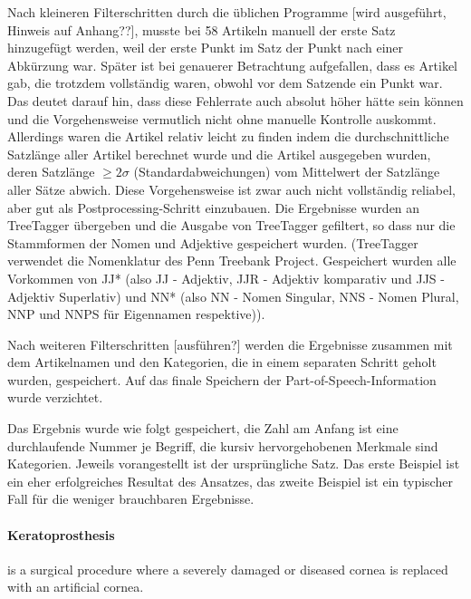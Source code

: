 \documentclass[pagesize,DIV=calc,12pt,draft]{scrreprt}
\begin{document}
\begin{inparaenum}
\item   Nach kleineren Filterschritten durch die üblichen Programme {[}wird   ausgeführt, Hinweis auf Anhang??{]}, musste bei 58 Artikeln manuell   der erste Satz hinzugefügt werden, weil der erste Punkt im Satz der   Punkt nach einer Abkürzung war. 
Später ist bei genauerer Betrachtung   aufgefallen, dass es Artikel gab, die trotzdem vollständig waren,   obwohl vor dem Satzende ein Punkt war. 
Das deutet darauf hin, dass   diese Fehlerrate auch absolut höher hätte sein können und die   Vorgehensweise vermutlich nicht ohne manuelle Kontrolle auskommt. 
Allerdings waren die Artikel relativ leicht zu finden indem die   durchschnittliche Satzlänge aller Artikel berechnet wurde und die   Artikel ausgegeben wurden, deren Satzlänge $\geq 2 \sigma $   (Standardabweichungen) vom Mittelwert der Satzlänge aller Sätze abwich. 
Diese Vorgehensweise ist   zwar auch nicht vollständig reliabel, aber gut als   Postprocessing-Schritt einzubauen. 
Die Ergebnisse wurden an TreeTagger   übergeben und die Ausgabe von TreeTagger gefiltert, so dass nur die   Stammformen der Nomen und Adjektive gespeichert wurden. (TreeTagger   verwendet die Nomenklatur des Penn Treebank Project. 
Gespeichert   wurden alle Vorkommen von JJ* (also JJ - Adjektiv, JJR - Adjektiv   komparativ und JJS - Adjektiv Superlativ) und NN* (also NN - Nomen   Singular, NNS - Nomen Plural, NNP und NNPS für Eigennamen   respektive)). 

\item   Nach weiteren Filterschritten {[}ausführen?{]} werden die Ergebnisse   zusammen mit dem Artikelnamen und den Kategorien, die in einem   separaten Schritt geholt wurden, gespeichert. 
Auf das finale Speichern   der Part-of-Speech-Information wurde verzichtet. 
\end{inparaenum}

Das Ergebnis wurde wie folgt gespeichert, die Zahl am Anfang ist eine durchlaufende Nummer je Begriff, die kursiv hervorgehobenen Merkmale sind Kategorien. 
Jeweils vorangestellt ist der ursprüngliche Satz. 
Das erste Beispiel ist ein eher erfolgreiches Resultat des Ansatzes, das zweite Beispiel ist ein typischer Fall für die weniger brauchbaren Ergebnisse. 

\paragraph{Keratoprosthesis} is a surgical procedure where a severely damaged or diseased cornea is replaced with an artificial cornea.
\end{document}
